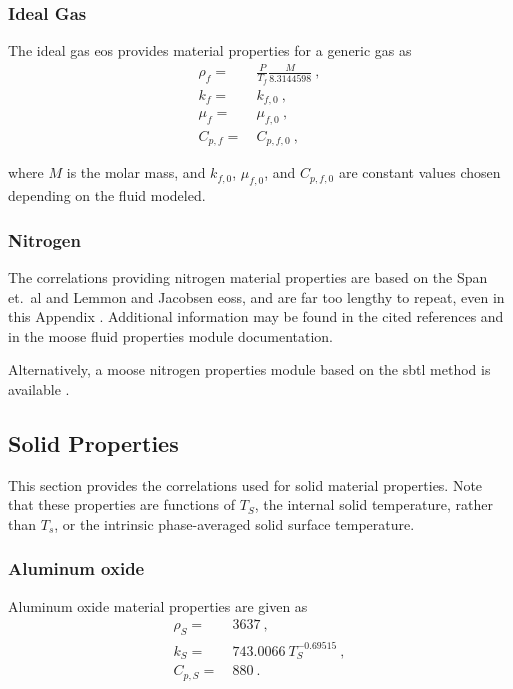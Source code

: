 \begin{appendices}
\subsubsection*{Ideal Gas}
The ideal gas \gls{eos} provides material properties for a generic gas as
\begin{subequations}
\begin{align}
\rho_f=&\ \frac{P}{T_f}\frac{M}{8.3144598}\ ,\\
k_f=&\ k_{f,0}\ ,\\
\mu_f=&\ \mu_{f,0}\ ,\\
C_{p,f}=&\ C_{p,f,0}\ ,
\end{align}
\end{subequations}

\noindent where \(M\) is the molar mass, and \(k_{f,0}\), \(\mu_{f,0}\), and \(C_{p,f,0}\) are constant values chosen depending on the fluid modeled.

\subsubsection*{Nitrogen}
The correlations providing nitrogen material properties are based on the Span et.\ al and Lemmon and Jacobsen \glspl{eos}, and are far too lengthy to repeat, even in this Appendix \cite{span,lemmon}. Additional information may be found in the cited references and in the \gls{moose} fluid properties module documentation.

Alternatively, a \gls{moose} nitrogen properties module based on the \gls{sbtl} method is available \cite{kunick}.

\subsection*{Solid Properties}

This section provides the correlations used for solid material properties. Note that these properties are functions of \(T_S\), the internal solid temperature, rather than \(T_s\), or the intrinsic phase-averaged solid surface temperature. 

\subsubsection*{Aluminum oxide}
Aluminum oxide material properties are given as \cite{SANA,aluminum_oxide_cp}
\begin{subequations}
\begin{align}
\rho_S=&\ 3637\ ,\\
k_S=&\ 743.0066\ T_S^{-0.69515}\ , \\
C_{p,S}=&\ 880\ .
\end{align}
\end{subequations}


\end{appendices}
